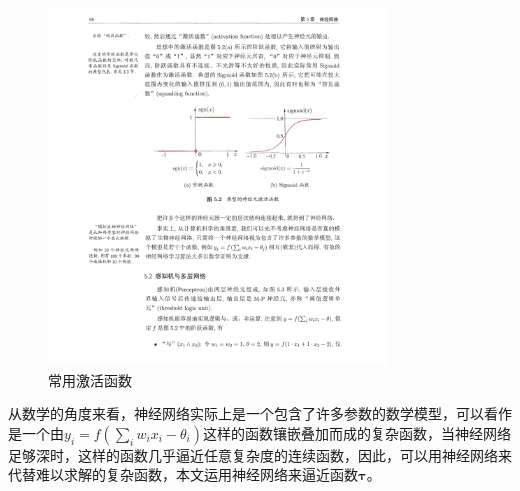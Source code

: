 \begin{figure}[htbp]
\begin{center}
\includegraphics[width=0.8\textwidth]{figures//3.pdf}
\caption{常用激活函数}
\label{default}
\end{center}
\end{figure}
\par 从数学的角度来看，神经网络实际上是一个包含了许多参数的数学模型，可以看作是一个由$y_i = f(\sum_i w_ix_i-\theta_i)$这样的函数镶嵌叠加而成的复杂函数，当神经网络足够深时，这样的函数几乎逼近任意复杂度的连续函数，因此，可以用神经网络来代替难以求解的复杂函数，本文运用神经网络来逼近函数$\boldsymbol{\tau}$。
